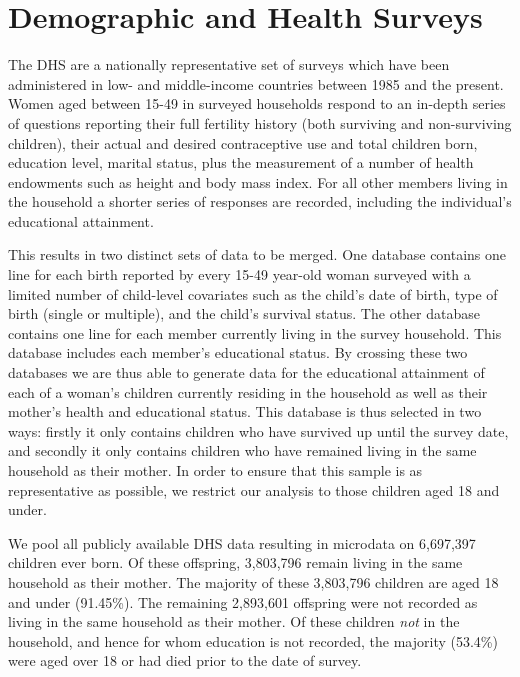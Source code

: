 \section{Demographic and Health Surveys}

The DHS are a nationally representative set of surveys which have been 
administered in low- and middle-income countries between 1985 and the present.
Women aged between 15-49 in surveyed households respond to an in-depth series 
of questions reporting their full fertility history (both surviving and 
non-surviving children), their actual and desired contraceptive use and total
children born, education level, marital status, plus the measurement of a 
number of health endowments such as height and body mass index.  For all other 
members living in the household a shorter series of responses are recorded, 
including the individual's educational attainment.

This results in two distinct sets of data to be merged.  One database contains
one line for each birth reported by every 15-49 year-old woman surveyed with
a limited number of child-level covariates such as the child's date of birth,
type of birth (single or multiple), and the child's survival status.  The other
database contains one line for each member currently living in the survey 
household.  This database includes each member's educational status.  By 
crossing these two databases we are thus able to generate data for the
educational attainment of each of a woman's children currently residing in the 
household as well as their mother's health and educational status.  This 
database is thus selected in two ways: firstly it only contains children who
have survived up until the survey date, and secondly it only contains children
who have remained living in the same household as their mother.  In order to
ensure that this sample is as representative as possible, we restrict our
analysis to those children aged 18 and under.

We pool all publicly available DHS data resulting in microdata on 6,697,397 
children ever born.  Of these offspring, 3,803,796 remain living in the same
household as their mother.  The majority of these 3,803,796 children are aged
18 and under (91.45\%).  The remaining 2,893,601 offspring were not recorded
as living in the same household as their mother.  Of these children \emph{not}
in the household, and hence for whom education is not recorded, the majority
(53.4\%) were aged over 18 or had died prior to the date of survey.

